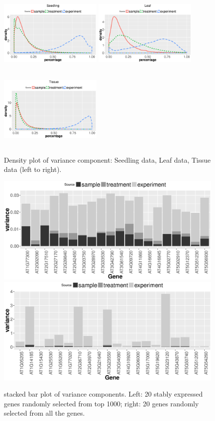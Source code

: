 \documentclass[11pt, a4paper]{article}
\begin{document}
 \begin{figure}[h]
\begin{center}
\includegraphics[width=5cm,height=4cm]{Figures/var_dens1.eps}
\includegraphics[width=5cm,height=4cm]{Figures/var_dens2.eps}
\includegraphics[width=5cm,height=4cm]{Figures/var_dens3.eps}
\caption{ Density plot of variance component: Seedling data, Leaf data, Tissue data (left to right).}
\label{fig:densityplot}
\end{center}
\end{figure} 


\begin{figure}[!h]
	\centering
	\includegraphics[width=0.8\linewidth]{Figures/top1000.eps}
	\includegraphics[width=0.8\linewidth]{Figures/all.eps}
	\caption{stacked bar plot of variance components. Left: 20 stably expressed genes randomly selected from top 1000; right: 20 genes randomly selected from all the genes.}
	\label{fig:all}
\end{figure}
\end{document}
